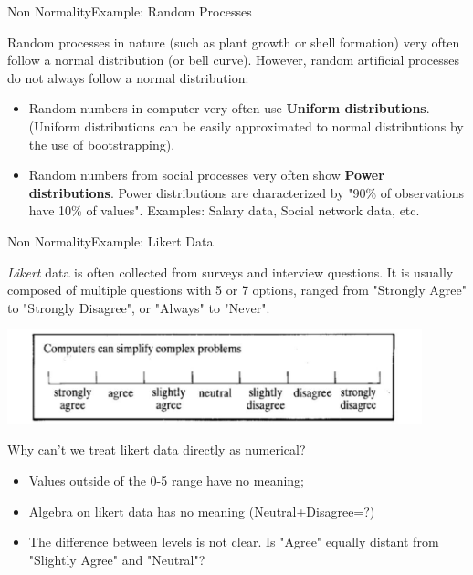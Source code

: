 \begin{frame}{Non Normality}{Example: Random Processes} %

  Random processes in nature (such as plant growth or shell formation) very
  often follow a normal distribution (or bell curve). However, random artificial
  processes do not always follow a normal distribution: \bigskip

  \begin{itemize}

    \item Random numbers in computer very often use {\bf Uniform distributions}.
    (Uniform distributions can be easily approximated to normal distributions
    by the use of bootstrapping).\bigskip

    \item Random numbers from social processes very often show {\bf Power
    distributions}. Power distributions are characterized by "90\% of observations
    have 10\% of values". Examples: Salary data, Social network data, etc.

  \end{itemize}
\end{frame}

\begin{frame}{Non Normality}{Example: Likert Data} %

\emph{Likert} data is often collected from surveys and interview questions. It
is usually  composed of multiple questions with 5 or 7 options, ranged from
"Strongly Agree" to "Strongly Disagree", or "Always" to "Never".\bigskip

\begin{center}
  \includegraphics[width=0.9\textwidth]{../img/likert_scale}
\end{center}

Why can't we treat likert data directly as numerical?
\begin{itemize}
  \item Values outside of the 0-5 range have no meaning;
  \item Algebra on likert data has no meaning (Neutral+Disagree=?)
  \item The difference between levels is not clear. Is "Agree" equally
  distant from "Slightly Agree" and "Neutral"?
\end{itemize}
\end{frame}


